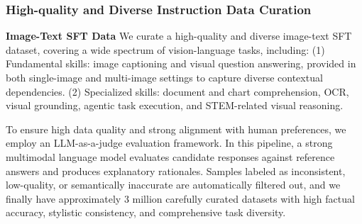 \documentclass{article}
\begin{document}
\subsubsection{High-quality and Diverse Instruction Data Curation}
\label{sec:sft_data_curation}

\textbf{Image-Text SFT Data}
We curate a high-quality and diverse image-text SFT dataset, covering a wide spectrum of vision-language tasks, including: (1) Fundamental skills: image captioning and visual question answering, provided in both single-image and multi-image settings to capture diverse contextual dependencies. (2) Specialized skills: document and chart comprehension, OCR, visual grounding, agentic task execution, and STEM-related visual reasoning.

To ensure high data quality and strong alignment with human preferences, we employ an LLM-as-a-judge evaluation framework. In this pipeline, a strong multimodal language model evaluates candidate responses against reference answers and produces explanatory rationales. Samples labeled as inconsistent, low-quality, or semantically inaccurate are automatically filtered out, and we finally have approximately 3 million carefully curated datasets with high factual accuracy, stylistic consistency, and comprehensive task diversity.
\end{document}

